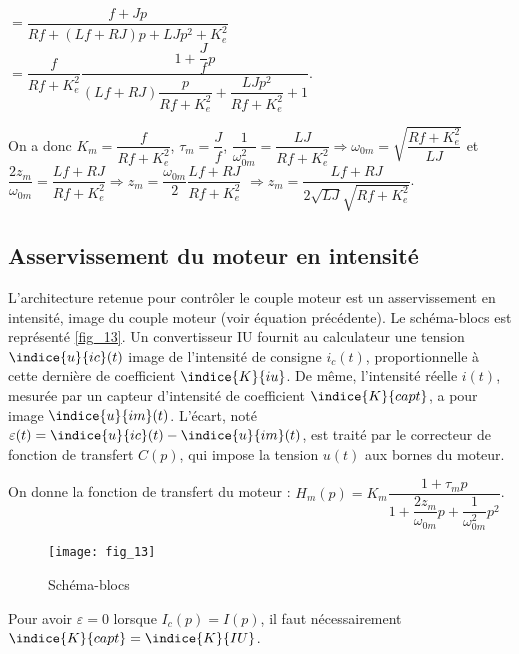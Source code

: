 \begin{multicols}{2}
\begin{corrige}
$ = \dfrac{f+Jp}{Rf+\left(Lf + RJ\right)p+LJp^2 +K_e^2 }$
$ = \dfrac{f}{Rf+K_e^2} \dfrac{1+\dfrac{J}{f}p}{\left(Lf + RJ\right)\dfrac{p}{Rf+K_e^2}+\dfrac{LJp^2}{Rf+K_e^2}+1 }$.

On a donc $K_m = \dfrac{f}{Rf+K_e^2}$, $\tau_m=\dfrac{J}{f}$, 
$\dfrac{1}{\omega_{0m}^2} = \dfrac{LJ}{Rf+K_e^2} \Rightarrow \omega_{0m} = \sqrt{\dfrac{Rf+K_e^2}{LJ}} $
et $ \dfrac{2z_m}{\omega_{0m}} = \dfrac{Lf + RJ}{Rf+K_e^2} \Rightarrow z_m = \dfrac{\omega_{0m}}{2}\dfrac{Lf + RJ}{Rf+K_e^2}$
$\Rightarrow z_m = \dfrac{Lf + RJ}{2\sqrt{LJ}\sqrt{Rf+K_e^2}}$.

\end{corrige}
\else
\fi


\subsection*{Asservissement du moteur en intensité}
\ifprof
\else

L’architecture retenue pour contrôler le couple moteur est un asservissement en intensité, image du
couple moteur (voir équation précédente). Le schéma-blocs est représenté \autoref{fig_13}. Un convertisseur IU
fournit au calculateur une tension $\indice{u}{ic}(t)$ image de l’intensité de consigne $i_c(t)$, proportionnelle à cette
dernière de coefficient $\indice{K}{iu}$. De même, l’intensité réelle $i(t)$, mesurée par un capteur d’intensité de
coefficient $\indice{K}{capt}$, a pour image $\indice{u}{im}(t)$. L’écart, noté $\varepsilon(t) = \indice{u}{ic}(t) - \indice{u}{im}(t)$, est traité par le correcteur de fonction de transfert $C(p)$, qui impose la tension $u(t)$ aux bornes du moteur.

On donne la fonction de transfert du moteur : $H_m(p)=K_m\dfrac{1+\tau_m p}{1+\dfrac{2z_m}{\omega_{0m}}p+\dfrac{1}{\omega_{0m}^2}p^2}$.


\begin{figure}[H]
\centering
\texttt{[image: fig\_13]}
\caption{Schéma-blocs \label{fig_13}}
\end{figure}
\fi

\ifprof
\begin{corrige}

Pour avoir $\varepsilon = 0$ lorsque $I_c(p)=I(p)$, il faut nécessairement $\indice{K}{capt}=\indice{K}{IU}$.


\end{corrige}
\end{multicols}

